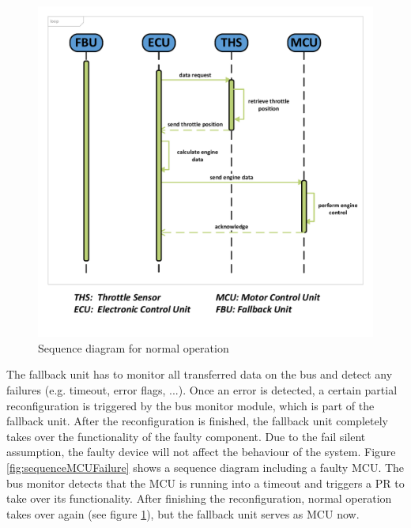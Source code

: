 \begin{figure}[h!]
    \centering
    \includegraphics[width=\textwidth]{figures/sequence_normal_op.pdf}
    \caption{Sequence diagram for normal operation}\label{fig:sequenceNormalOp}
\end{figure}

The fallback unit has to monitor all transferred data on the bus and detect any failures (e.g. timeout, error flags, ...). 
Once an error is detected, a certain partial reconfiguration is triggered by the bus monitor module, which is part of the fallback unit. 
After the reconfiguration is finished, the fallback unit completely takes over the functionality of the faulty component. 
Due to the fail silent assumption, the faulty device will not affect the behaviour of the system. 
Figure \ref{fig:sequenceMCUFailure} shows a sequence diagram including a faulty \gls{MCU}. 
The bus monitor detects that the \gls{MCU} is running into a timeout and triggers a \gls{PR} to take over its functionality. 
After finishing the reconfiguration, normal operation takes over again (see figure \ref{fig:sequenceNormalOp}), but the fallback unit serves as \gls{MCU} now.

